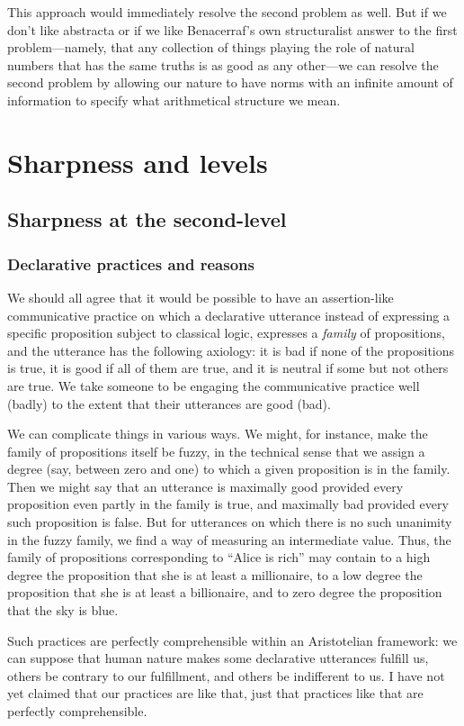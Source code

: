 This approach would immediately resolve the second problem as well. But if we don't like abstracta or if we like 
Benacerraf's own structuralist answer
to the first problem---namely, that any collection of things playing the role of natural numbers that has the 
same truths is as good as any other---we can resolve the second problem by allowing our nature to have norms
with an infinite amount of information to specify what arithmetical structure we mean. 

\section{Sharpness and levels}
\subsection{Sharpness at the second-level}\label{sec:limiting}
\subsubsection{Declarative practices and reasons}
We should all agree that it would be possible to have an assertion-like communicative practice on which a declarative utterance instead of expressing 
a specific proposition subject to classical logic, expresses a \textit{family} of propositions, and the utterance has the following
axiology: it is bad if none of the propositions is true, it is good if all of them are true, and it is neutral if some but not others are
true. We take someone to be engaging the communicative practice well (badly) to the extent that their utterances are good (bad).

We can complicate things in various ways. We might, for instance, make the family of propositions itself be fuzzy, in the technical sense that we assign
a degree (say, between zero and one) to which a given proposition is in the family. Then we might say that an utterance is maximally good provided every proposition
even partly in the family is true, and maximally bad provided every such proposition is false. But for utterances on which there is no
such unanimity in the fuzzy family, we find a way of measuring an intermediate value.  Thus, the family of propositions
corresponding to ``Alice is rich'' may contain to a high degree the proposition that she is at least a millionaire, to a low degree 
the proposition that she is at least a billionaire, and to zero degree the proposition that the sky is blue. 

Such practices are perfectly 
comprehensible within an Aristotelian framework: we can suppose that human nature makes some declarative utterances fulfill us, others
be contrary to our fulfillment, and others be indifferent to us.
I have not yet claimed that our practices are like that, just that practices like that are perfectly comprehensible.

